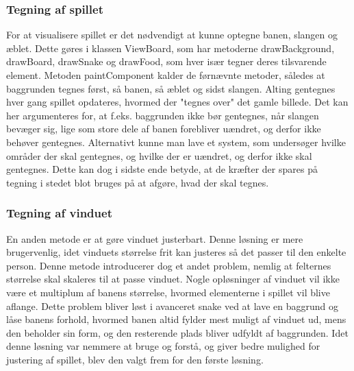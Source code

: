 \subsubsection{Tegning af spillet}
For at visualisere spillet er det nødvendigt at kunne optegne banen, slangen og æblet. Dette gøres i klassen ViewBoard, som har metoderne drawBackground, drawBoard, drawSnake og drawFood, som hver især tegner deres tilsvarende element. Metoden paintComponent kalder de førnævnte metoder, således at baggrunden tegnes først, så banen, så æblet og sidst slangen. Alting gentegnes hver gang spillet opdateres, hvormed der "tegnes over" det gamle billede. Det kan her argumenteres for, at f.eks. baggrunden ikke bør gentegnes, når slangen bevæger sig, lige som store dele af banen forebliver uændret, og derfor ikke behøver gentegnes. Alternativt kunne man lave et system, som undersøger hvilke områder der skal gentegnes, og hvilke der er uændret, og derfor ikke skal gentegnes. Dette kan dog i sidste ende betyde, at de kræfter der spares på tegning i stedet blot bruges på at afgøre, hvad der skal tegnes.

\subsubsection{Tegning af vinduet}
En anden metode er at gøre vinduet justerbart. Denne løsning er mere brugervenlig, idet vinduets størrelse frit kan justeres så det passer til den enkelte person. Denne metode introducerer dog et andet problem, nemlig at felternes størrelse skal skaleres til at passe vinduet. Nogle opløsninger af vinduet vil ikke være et multiplum af banens størrelse, hvormed elementerne i spillet vil blive aflange. Dette problem bliver løst i avanceret snake ved at lave en baggrund og låse banens forhold, hvormed banen altid fylder mest muligt af vinduet ud, mens den beholder sin form, og den resterende plads bliver udfyldt af baggrunden. Idet denne løsning var nemmere at bruge og forstå, og giver bedre mulighed for justering af spillet, blev den valgt frem for den første løsning.